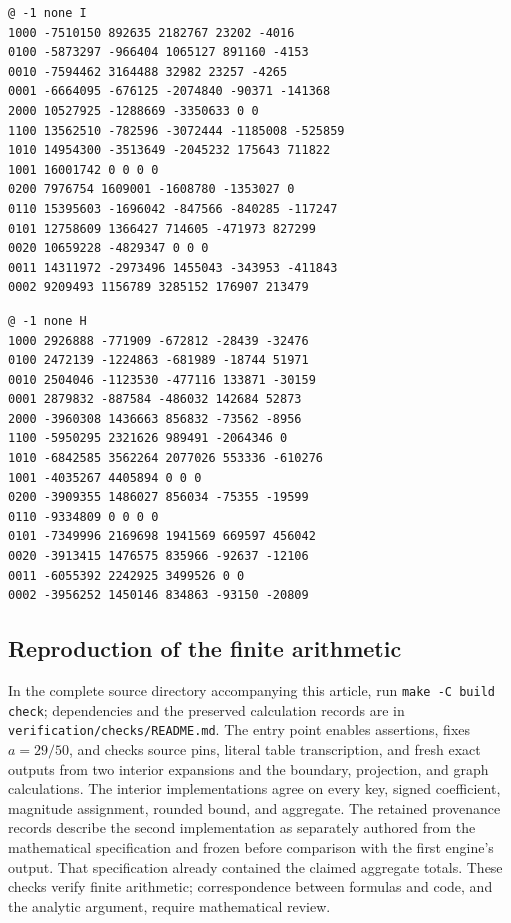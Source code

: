 \begin{Verbatim}[fontsize=\footnotesize]
@ -1 none I
1000 -7510150 892635 2182767 23202 -4016
0100 -5873297 -966404 1065127 891160 -4153
0010 -7594462 3164488 32982 23257 -4265
0001 -6664095 -676125 -2074840 -90371 -141368
2000 10527925 -1288669 -3350633 0 0
1100 13562510 -782596 -3072444 -1185008 -525859
1010 14954300 -3513649 -2045232 175643 711822
1001 16001742 0 0 0 0
0200 7976754 1609001 -1608780 -1353027 0
0110 15395603 -1696042 -847566 -840285 -117247
0101 12758609 1366427 714605 -471973 827299
0020 10659228 -4829347 0 0 0
0011 14311972 -2973496 1455043 -343953 -411843
0002 9209493 1156789 3285152 176907 213479
\end{Verbatim}
\begin{Verbatim}[fontsize=\footnotesize]
@ -1 none H
1000 2926888 -771909 -672812 -28439 -32476
0100 2472139 -1224863 -681989 -18744 51971
0010 2504046 -1123530 -477116 133871 -30159
0001 2879832 -887584 -486032 142684 52873
2000 -3960308 1436663 856832 -73562 -8956
1100 -5950295 2321626 989491 -2064346 0
1010 -6842585 3562264 2077026 553336 -610276
1001 -4035267 4405894 0 0 0
0200 -3909355 1486027 856034 -75355 -19599
0110 -9334809 0 0 0 0
0101 -7349996 2169698 1941569 669597 456042
0020 -3913415 1476575 835966 -92637 -12106
0011 -6055392 2242925 3499526 0 0
0002 -3956252 1450146 834863 -93150 -20809
\end{Verbatim}
\endgroup

\subsection{Reproduction of the finite arithmetic}\label{app:reproduction}
In the complete source directory accompanying this article, run
\texttt{make -C build check}; dependencies and the preserved calculation records are in
\texttt{verification/checks/README.md}.  The entry point enables assertions, fixes
$a=29/50$, and checks source pins, literal table transcription, and fresh
exact outputs from two interior expansions and the
boundary, projection, and graph calculations.  The interior implementations
agree on every key, signed coefficient, magnitude assignment, rounded bound,
and aggregate. The retained provenance records describe the second
implementation as separately authored from the mathematical specification
and frozen before comparison with the first engine's output. That
specification already contained the claimed aggregate totals. These checks
verify finite arithmetic; correspondence
between formulas and code, and the analytic argument, require mathematical
review.
